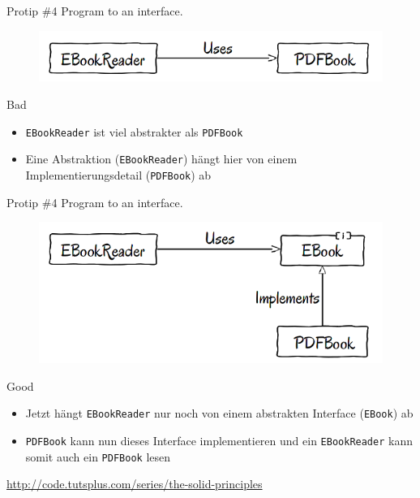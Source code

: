 \documentclass[18pt]{beamer}
\begin{document}
\begin{frame}{Protip \#4 Program to an interface.}
    \begin{figure}
        \includegraphics[scale=.4]{img/ebookreader-pdfbook.png}
    \end{figure}
    \begin{alertblock}{Bad}
        \begin{itemize}
            \item \texttt{EBookReader} ist viel abstrakter als \texttt{PDFBook}
            \item Eine Abstraktion (\texttt{EBookReader}) hängt hier von einem Implementierungsdetail (\texttt{PDFBook}) ab
        \end{itemize}
    \end{alertblock}
\end{frame}

\begin{frame}{Protip \#4 Program to an interface.}
    \begin{figure}
        \includegraphics[scale=.4]{img/ebookreader-ebookinterface-pdfbook.png}
    \end{figure}
    \begin{exampleblock}{Good}
        \begin{itemize}
            \item Jetzt hängt \texttt{EBookReader} nur noch von einem abstrakten Interface (\texttt{EBook}) ab
            \item \texttt{PDFBook} kann nun dieses Interface implementieren und ein \texttt{EBookReader} kann somit auch ein \texttt{PDFBook} lesen
        \end{itemize}
    \end{exampleblock}

    \vspace{.1in}
    \footnotesize
    \url{http://code.tutsplus.com/series/the-solid-principles}
    \vspace{.1in}
\end{frame}
\end{document}
